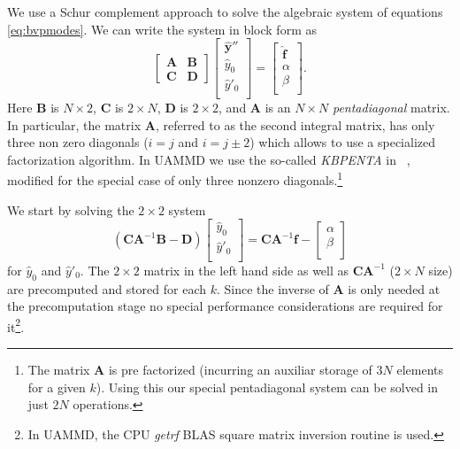 \documentclass[twoside,openright,titlepage,numbers=noenddot,%
headinclude,footinclude,cleardoublepage=empty,abstract=on,
BCOR=5mm,fontsize=11pt, dvipsnames, paper=b5
]{scrreprt}
\newcommand{\uammd}{\gls{UAMMD}\xspace}
\newcommand{\fou}[1]{\widehat{#1}}
\begin{document}
We use a Schur complement approach to solve the algebraic system of equations \eqref{eq:bvpmodes}. We can write the system in block form as 
\begin{equation}
\label{eq:blocksys}
\begin{bmatrix} \bm{A} & \bm{B} \\[2 pt] \bm{C} & \bm{D} \end{bmatrix}
\begin{bmatrix} \fou{\bm{y}}''\\ \fou{y}_0 \\ \fou{y}'_0 \\ \end{bmatrix}
= \begin{bmatrix}  \fou{\bm{f}}\\ \alpha \\ \beta\\ \end{bmatrix}. 
\end{equation}
Here $\bm{B}$ is $N \times 2$, $\bm{C}$ is $2 \times N$, $\bm{D}$ is $2 \times 2$, and $\bm{A}$ is an $N \times N$ \textit{pentadiagonal} matrix. In particular, the matrix $\bm{A}$, referred to as the second integral matrix, has only three non zero diagonals ($i=j$ and $i = j\pm 2$) which allows to use a specialized factorization algorithm. In \uammd we use the so-called \emph{KBPENTA} in ~\cite{Karawia2010}, modified for the special case of only three nonzero diagonals.\footnote{The matrix $\bm{A}$ is pre factorized (incurring an auxiliar storage of $3N$ elements for a given $k$). Using this our special pentadiagonal system can be solved in just $2N$ operations.} 

We start by solving the $2 \times 2$ system
\begin{equation}
(\bm{C}\bm{A}^{-1}\bm{B}-\bm{D})\begin{bmatrix}  \fou{y}_0 \\ \fou{y}'_0\\ \end{bmatrix} = \bm{C}\bm{A}^{-1}\bm{f}-\begin{bmatrix}  \alpha \\ \beta\\ \end{bmatrix}
\end{equation}
for $\fou{y}_0$ and $\fou{y}'_0$. The $2\times 2$ matrix in the left hand side as well as $\bm{C}\bm{A}^{-1}$ ($2\times N$ size) are precomputed and stored for each $k$. Since the inverse of $\bm{A}$ is only needed at the precomputation stage no special performance considerations are required for it\footnote{In \uammd, the CPU \emph{getrf} BLAS square matrix inversion routine is used.}.
\end{document}
